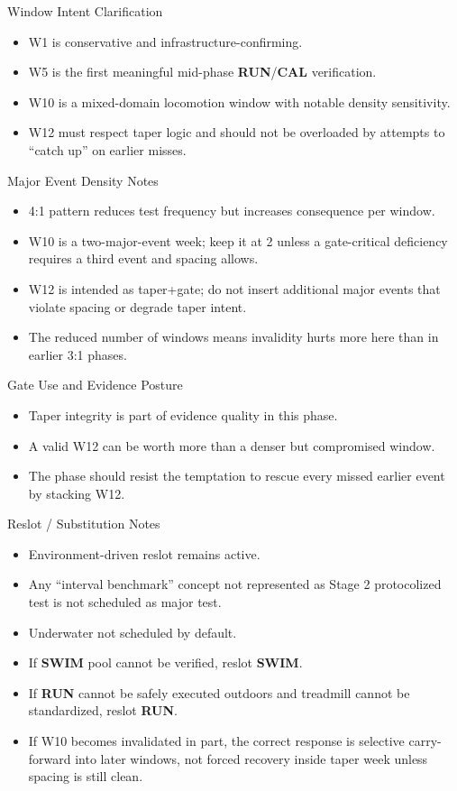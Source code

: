 \documentclass[10pt]{article}
\begin{document}
Window Intent Clarification

\begin{itemize}
\item W1 is conservative and infrastructure-confirming.
\item W5 is the first meaningful mid-phase \textbf{RUN}/\textbf{CAL} verification.
\item W10 is a mixed-domain locomotion window with notable density sensitivity.
\item W12 must respect taper logic and should not be overloaded by attempts to “catch up” on earlier misses.
\end{itemize}

Major Event Density Notes

\begin{itemize}
\item 4:1 pattern reduces test frequency but increases consequence per window.
\item W10 is a two-major-event week; keep it at 2 unless a gate-critical deficiency requires a third event and spacing allows.
\item W12 is intended as taper+gate; do not insert additional major events that violate spacing or degrade taper intent.
\item The reduced number of windows means invalidity hurts more here than in earlier 3:1 phases.
\end{itemize}

Gate Use and Evidence Posture

\begin{itemize}
\item Taper integrity is part of evidence quality in this phase.
\item A valid W12 can be worth more than a denser but compromised window.
\item The phase should resist the temptation to rescue every missed earlier event by stacking W12.
\end{itemize}

Reslot / Substitution Notes

\begin{itemize}
\item Environment-driven reslot remains active.
\item Any “interval benchmark” concept not represented as Stage 2 protocolized test is not scheduled as major test.
\item Underwater not scheduled by default.
\item If \textbf{SWIM} pool cannot be verified, reslot \textbf{SWIM}.
\item If \textbf{RUN} cannot be safely executed outdoors and treadmill cannot be standardized, reslot \textbf{RUN}.
\item If W10 becomes invalidated in part, the correct response is selective carry-forward into later windows, not forced recovery inside taper week unless spacing is still clean.
\end{itemize}
\end{document}
